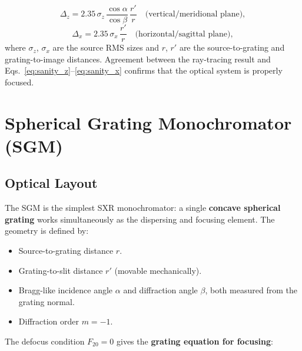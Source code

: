 \documentclass[12pt,a4paper]{article}
\newcommand{\placeholder}[4][\linewidth]{%
  \begin{figure}[H]
    \centering
    \begin{tikzpicture}
      \draw[fill=plbg, draw=plframe, line width=1pt, dashed]
            (0,0) rectangle (#1, #2);
      \draw[plframe, line width=0.4pt] (0,0) -- (#1,#2);
      \draw[plframe, line width=0.4pt] (#1,0) -- (0,#2);
      \node[anchor=north west, font=\small\bfseries\color{plframe},
            inner sep=4pt] at (0,#2) {#3};
      \node[anchor=center, font=\small\itshape\color{pltext},
            text width=0.75\linewidth, align=center]
            at ({0.5*#1},{0.5*#2}) {#4};
    \end{tikzpicture}
  \end{figure}
}
\newcommand{\al}{\alpha}
\newcommand{\be}{\beta}
\begin{document}
\begin{equation}
  \Delta_z = 2.35\,\sigma_z\,\frac{\cos\al}{\cos\be}\,\frac{r'}{r}
  \quad\text{(vertical/meridional plane)},
  \label{eq:sanity_z}
\end{equation}
\begin{equation}
  \Delta_x = 2.35\,\sigma_x\,\frac{r'}{r}
  \quad\text{(horizontal/sagittal plane)},
  \label{eq:sanity_x}
\end{equation}
where $\sigma_z$, $\sigma_x$ are the source RMS sizes and $r$, $r'$ are the
source-to-grating and grating-to-image distances.  Agreement between the ray-tracing
result and Eqs.~\eqref{eq:sanity_z}--\eqref{eq:sanity_x} confirms that the optical system
is properly focused.


\section{Spherical Grating Monochromator (SGM)}

\subsection{Optical Layout}

The SGM is the simplest SXR monochromator: a single \textbf{concave spherical grating}
works simultaneously as the dispersing and focusing element.  The geometry is defined by:

\begin{itemize}
  \item Source-to-grating distance $r$.
  \item Grating-to-slit distance $r'$ (movable mechanically).
  \item Bragg-like incidence angle $\al$ and diffraction angle $\be$, both measured from
        the grating normal.
  \item Diffraction order $m = -1$.
\end{itemize}

The defocus condition $F_{20} = 0$ gives the \textbf{grating equation for focusing}:
\end{document}
